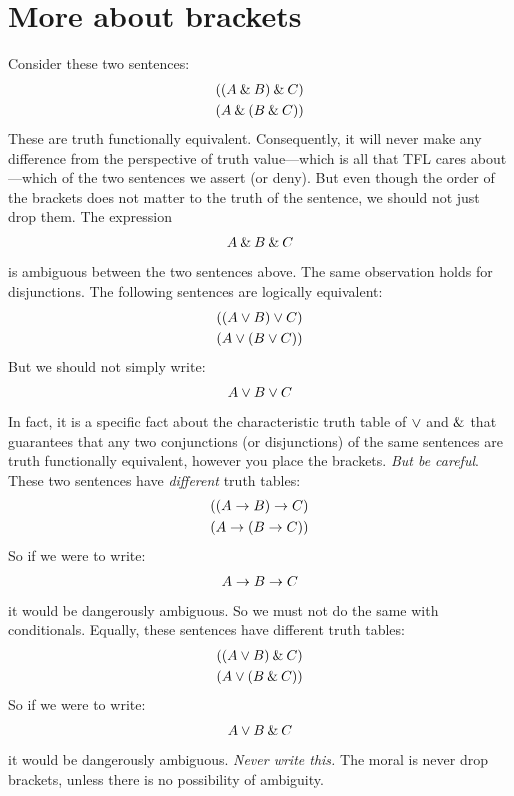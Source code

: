 
\section{More about brackets}\label{s:MoreBracketingConventions}
Consider these two sentences:
	\begin{align*}
		((A \mathbin{\&} B) \mathbin{\&} C)\\
		(A \mathbin{\&} (B \mathbin{\&} C))
	\end{align*}
These are truth functionally equivalent. Consequently, it will never make any difference from the perspective of truth value---which is all that TFL cares about---which of the two sentences we assert (or deny). But even though the order of the brackets does not matter to the truth of the sentence, we should not just drop them. The expression
	\begin{align*}
		A \mathbin{\&} B \mathbin{\&} C
	\end{align*}
is ambiguous between the two sentences above.  The same observation holds for disjunctions. The following sentences are logically equivalent:
	\begin{align*}
		((A \vee B) \vee C)\\
		(A \vee (B \vee C))
	\end{align*}
But we should not simply write:
	\begin{align*}
		A \vee B \vee C
	\end{align*}
In fact, it is a specific fact about the characteristic truth table of $\vee$ and $\mathbin{\&}$ that guarantees that any two conjunctions (or disjunctions) of the same sentences are truth functionally equivalent, however you place the brackets. \emph{But be careful}. These two sentences have \emph{different} truth tables:
	\begin{align*}
		((A \rightarrow B) \rightarrow C)\\
		(A \rightarrow (B \rightarrow C))
	\end{align*}
So if we were to write:
	\begin{align*}
		A \rightarrow B \rightarrow C
	\end{align*}
it would be dangerously ambiguous. So we must not do the same with conditionals. Equally, these sentences have different truth tables:
	\begin{align*}
		((A \vee B) \mathbin{\&} C)\\
		(A \vee (B \mathbin{\&} C))
	\end{align*}
So if we were to write:
	\begin{align*}
		A \vee B \mathbin{\&} C
	\end{align*}
it would be dangerously ambiguous. \emph{Never write this.} The moral is never drop brackets, unless there is no possibility of ambiguity.

